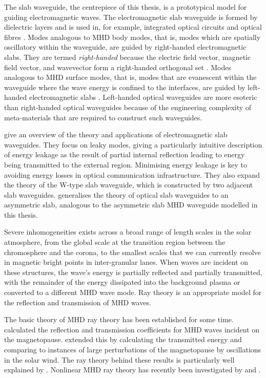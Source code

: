 	The slab waveguide, the centrepiece of this thesis, is a prototypical model for guiding electromagnetic waves. The electromagnetic slab waveguide is formed by dielectric layers and is used in, for example, integrated optical circuits and optical fibres \citep{ram_etal84}. Modes analogous to MHD body modes, that is, modes which are spatially oscillatory within the waveguide, are guided by right-handed electromagnetic slabs. They are termed \textit{right-handed} because the electric field vector, magnetic field vector, and wavevector form a right-handed orthogonal set \citep{ram_etal84}. Modes analogous to MHD surface modes, that is, modes that are evanescent within the waveguide where the wave energy is confined to the interfaces, are guided by left-handed electromagnetic slabs \citep{wan_etal08,ash13,sha_etal03}. Left-handed optical waveguides are more esoteric than right-handed optical waveguides because of the engineering complexity of meta-materials that are required to construct such waveguides.
	
	\cite{Hu_etal09} give an overview of the theory and applications of electromagnetic slab waveguides. They focus on leaky modes, giving a particularly intuitive description of energy leakage as the result of partial internal reflection leading to energy being transmitted to the external region. Minimising energy leakage is key to avoiding energy losses in optical communication infrastructure. They also expand the theory of the W-type slab waveguide, which is constructed by two adjacent slab waveguides. \cite{mar74} generalises the theory of optical slab waveguides to an asymmetric slab, analogous to the asymmetric slab MHD waveguide modelled in this thesis.
	
	Severe inhomogeneities exists across a broad range of length scales in the solar atmosphere, from the global scale at the transition region between the chromosphere and the corona, to the smallest scales that we can currently resolve in magnetic bright points in inter-granular lanes. When waves are incident on these structures, the wave's energy is partially reflected and partially transmitted, with the remainder of the energy dissipated into the background plasma or converted to a different MHD wave mode. Ray theory is an appropriate model for the reflection and transmission of MHD waves.
	
	The basic theory of MHD ray theory has been established for some time. \cite{mck70} calculated the reflection and transmission coefficients for MHD waves incident on the magnetopause. \cite{ver73} extended this by calculating the transmitted energy and \cite{wol_etal75} comparing to instances of large perturbations of the magnetopause by oscillations in the solar wind. The ray theory behind these results is particularly well explained by \cite{wal04}. Nonlinear MHD ray theory has recently been investigated by \cite{nun18} and \cite{nun20}.
	
